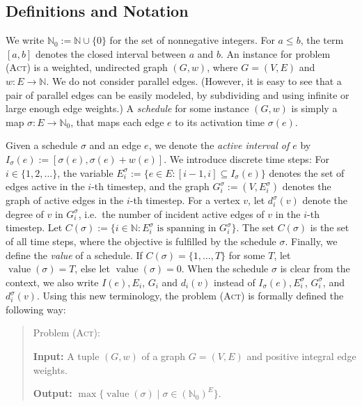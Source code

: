 \documentclass[runningheads]{llncs}
\numberwithin{equation}{section}
\newcommand{\N}{\mathbb{N}}
\newcommand{\set}[1]{\{ #1 \}}
\newcommand{\fromto}[2]{\set{#1, \ldots, #2}}
\newcommand{\act}{\textsc{(Act)}}
\DeclareMathOperator{\val}{\text{value}}
\begin{document}
\subsection{Definitions and Notation}
\label{sec_notation}

We write $\N_0 := \N \cup \set{0}$ for the set of nonnegative integers. For $a \leq b$, the term $[a, b]$ denotes the closed interval between $a$ and $b$. An instance for problem {\act} is a weighted, undirected graph $(G, w)$, where $G = (V, E)$ and $w : E \rightarrow \N$. We do not consider parallel edges. (However, it is easy to see that a pair of parallel edges can be easily modeled, by subdividing and using infinite or large enough edge weights.) A \emph{schedule} for some instance $(G, w)$ is simply a map $\sigma : E \rightarrow \N_0$, that maps each edge $e$ to its activation time $\sigma(e)$. 

Given a schedule $\sigma$ and an edge $e$, we denote the \emph{active interval of $e$} by $I_\sigma(e) := [\sigma(e), \sigma(e) + w(e)]$. We introduce discrete time steps: For $i \in \{1, 2, \dots\}$, the variable $E^\sigma_i := \set{e \in E : [i-1, i] \subseteq I_\sigma(e)}$ denotes the set of edges active in the $i$-th timestep, and the graph $G^\sigma_i := (V, E^\sigma_i)$ denotes the graph of active edges in the $i$-th timestep. For a vertex $v$, let $d^\sigma_i(v)$ denote the degree of $v$ in $G^\sigma_i$, i.e.\ the number of incident active edges of $v$ in the $i$-th timestep.
Let $C(\sigma) := \set{i \in \N : E_i^\sigma \text{ is spanning in } G^\sigma_i}$. The set $C(\sigma)$ is the set of all time steps, where the objective is fulfilled by the schedule $\sigma$. Finally, we define the \emph{value} of a schedule. If $C(\sigma) = \fromto{1}{T}$ for some $T$, let $\val(\sigma) = T$, else let $\val(\sigma) = 0$. When the schedule $\sigma$ is clear from the context, we also write $I(e), E_i$, $G_i$ and $d_i(v)$ instead of $I_\sigma(e), E^\sigma_i$, $G^\sigma_i$, and $d^\sigma_i(v)$. Using this new terminology, the problem {\act} is formally defined the following way:

\begin{quote}
Problem {\act}: 

\textbf{Input:} A tuple $(G, w)$ of a graph $G = (V,E)$ and positive integral edge weights.

\textbf{Output:} $\max\set{\val(\sigma) \mid \sigma \in (\N_0)^E}$.
\end{quote}
\end{document}
